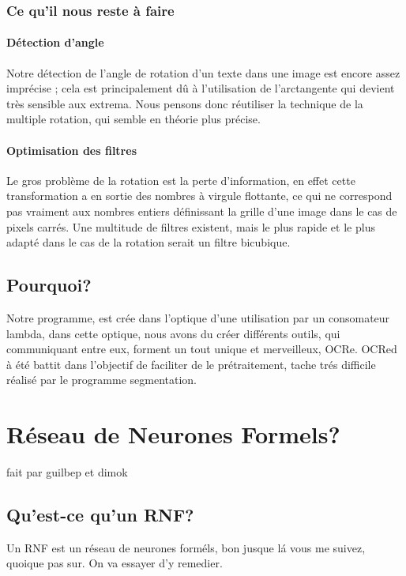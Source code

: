 \subsection{ Ce qu'il nous reste \`a faire}
\subsubsection{ D\'etection d'angle}
Notre d\'etection de l'angle de rotation d'un texte dans une image est
encore assez impr\'ecise ; cela est principalement d\^u \`a l'utilisation
de l'arctangente qui devient tr\`es sensible aux extrema. Nous pensons
donc r\'eutiliser la technique de la multiple rotation, qui semble en
th\'eorie plus pr\'ecise.
\subsubsection{ Optimisation des filtres}
Le gros probl\`eme de la rotation est la perte d'information, en effet
cette transformation a en sortie des nombres \`a virgule flottante,
ce qui ne correspond pas vraiment aux nombres entiers d\'efinissant la
grille d'une image dans le cas de pixels carr\'es. Une multitude de
filtres existent, mais le plus rapide et le plus adapt\'e dans le cas de la
rotation serait un filtre bicubique.
\section{Pourquoi?}
Notre programme, est cr\'ee dans l'optique d'une utilisation par un
consomateur lambda, dans cette optique, nous avons du cr\'eer diff\'erents
outils, qui communiquant entre eux, forment un tout unique et
merveilleux, OCRe.
OCRed \`a \'et\'e battit dans l'objectif de faciliter de le
pr\'etraitement, tache tr\'es difficile r\'ealis\'e par le programme segmentation.


\chapter{ R\'eseau de Neurones Formels?}
fait par guilbep et dimok

\section{ Qu'est-ce qu'un RNF?}
Un RNF est un r\'eseau de neurones form\'els, bon jusque l\'a vous me
suivez, quoique pas sur. On va essayer d'y remedier.
